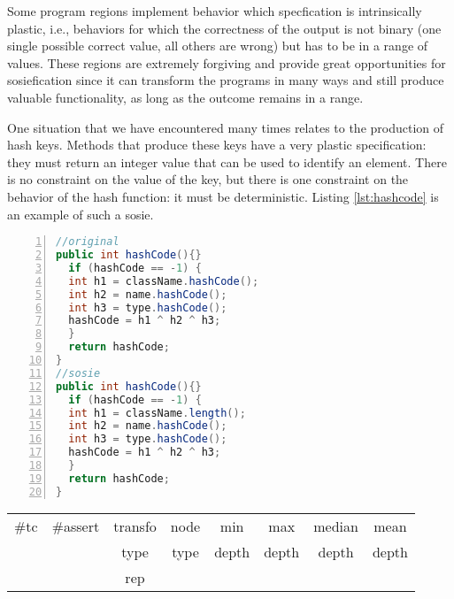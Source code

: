 Some program regions implement behavior which specfication is intrinsically plastic, i.e., behaviors for which the correctness of the output is not binary (one single possible correct value, all others are wrong) but has to be in a range of values. 
These regions are extremely forgiving and provide great opportunities for sosiefication since it can transform the programs in many ways and still produce valuable functionality, as long as the outcome remains in a range. 

One situation that we have encountered many times relates to the production of hash keys.
Methods that produce these keys have a very plastic specification: they must return an integer value that can be used to identify an element. There is no constraint on the value of the key, but there is one constraint on the behavior of the hash function: it must be deterministic.
Listing \ref{lst:hashcode} is an example of such a sosie.

\begin{minipage}{\columnwidth}
\begin{lstlisting}[caption={\texttt{hashCode} in Rhino and a sosie},label={lst:hashcode},language=java,numbers=left]
//original
public int hashCode(){}
  if (hashCode == -1) {
  int h1 = className.hashCode();
  int h2 = name.hashCode();
  int h3 = type.hashCode();
  hashCode = h1 ^ h2 ^ h3;
  }
  return hashCode;
}
//sosie
public int hashCode(){}
  if (hashCode == -1) {
  int h1 = className.length();
  int h2 = name.hashCode();
  int h3 = type.hashCode();
  hashCode = h1 ^ h2 ^ h3;
  }
  return hashCode;
}
\end{lstlisting}
\tabcolsep=0.11cm
\begin{tabular}{>{\small}c>{\small}c>{\small}c>{\small}c>{\small}c>{\small}c>{\small}c>{\small}c}
\hline
\rowcolor{lightgray} \#tc & \#assert & transfo & node & min & max & median & mean   \\
\rowcolor{lightgray}  & & type & type & depth  & depth & depth & depth  \\ 
\hline
&  & rep &  &  &  &  & \\
\hline
\end{tabular}
\end{minipage}
